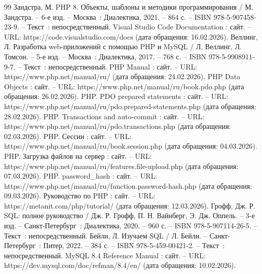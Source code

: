 
\begin{thebibliography}{99}
	 Зандстра, М. PHP 8. Объекты, шаблоны и методики программирования / М. Зандстра. -- 6-е изд. -- Москва~: Диалектика, 2021. -- 864 с. -- ISBN 978-5-907458-23-9. -- Текст~: непосредственный.
	 Visual Studio Code Documentation : сайт. -- URL: https://code.visualstudio.com/docs (дата обращения: 16.02.2026).
	 Веллинг, Л. Разработка web-приложений с помощью PHP и MySQL / Л. Веллинг, Л. Томсон. -- 5-е изд. -- Москва~: Диалектика, 2017. -- 768 с. -- ISBN 978-5-9908911-9-7. -- Текст~: непосредственный.
	 PHP Manual : сайт. -- URL: https://www.php.net/manual/ru/ (дата обращения: 24.02.2026).
	 PHP Data Objects : сайт. -- URL: https://www.php.net/manual/ru/book.pdo.php (дата обращения: 26.02.2026).
	 PHP. PDO prepared statements : сайт. -- URL: https://www.php.net/manual/ru/pdo.prepared-statements.php (дата обращения: 28.02.2026).
	 PHP. Transactions and auto-commit : сайт. -- URL: https://www.php.net/manual/ru/pdo.transactions.php (дата обращения: 02.03.2026).
	 PHP. Сессии : сайт. -- URL: https://www.php.net/manual/ru/\allowbreak book.session.php (дата обращения: 04.03.2026).
	 PHP. Загрузка файлов на сервер : сайт. -- URL: https://www.php.net/manual/ru/features.file-upload.php (дата обращения: 07.03.2026).
	 PHP. password\_hash : сайт. -- URL: https://www.php.net/manual/ru/function.password-hash.php (дата обращения: 09.03.2026).
	 Руководство по PHP : сайт. -- URL: https://metanit.com/php/tutorial/ (дата обращения: 12.03.2026).
	 Грофф, Дж. Р. SQL: полное руководство / Дж. Р. Грофф, П. Н. Вайнберг, Э. Дж. Оппель. -- 3-е изд. -- Санкт-Петербург~: Диалектика, 2020. -- 960 с. -- ISBN 978-5-907114-26-5. -- Текст~: непосредственный.
	 Бейли, Л. Изучаем SQL / Л. Бейли. -- Санкт-Петербург~: Питер, 2022. -- 384 с. -- ISBN 978-5-459-00421-2. -- Текст~: непосредственный.
	 MySQL 8.4 Reference Manual : сайт. -- URL: https://dev.mysql.com/doc/refman/8.4/en/ (дата обращения: 10.02.2026).
	

\end{thebibliography}
